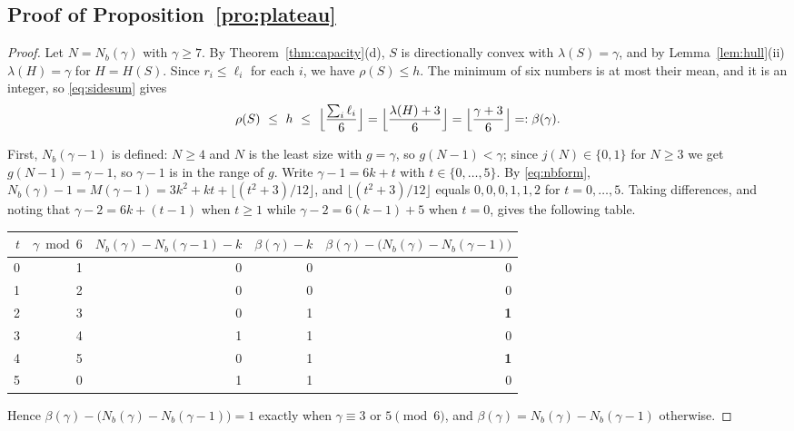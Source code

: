 \documentclass[11pt]{article}
\theoremstyle{plain}
\theoremstyle{definition}
\theoremstyle{remark}
\begin{document}
\subsection{Proof of Proposition~\ref{pro:plateau}}\label{sec:12.3}

\begin{proof}
Let \(N=N_{b}(\gamma)\) with \(\gamma\ge7\). By Theorem~\ref{thm:capacity}(d), \(S\) is
directionally convex with \(\lambda(S)=\gamma\), and by Lemma~\ref{lem:hull}(ii)
\(\lambda(H)=\gamma\) for \(H=H(S)\). Since \(r_{i}\le\ell_{i}\) for each \(i\), we have
\(\rho(S)\le h\). The minimum of six numbers is at most their mean, and it is an integer, so
\eqref{eq:sidesum} gives
\begin{equation}\label{eq:betadef}
   \rho(S)\ \le\ h\ \le\ \Bigl\lfloor\frac{\sum_{i}\ell_{i}}{6}\Bigr\rfloor
   =\Bigl\lfloor\frac{\lambda(H)+3}{6}\Bigr\rfloor
   =\Bigl\lfloor\frac{\gamma+3}{6}\Bigr\rfloor=:\beta(\gamma).
\end{equation}

First, \(N_{b}(\gamma-1)\) is defined: \(N\ge4\) and \(N\) is the least size with
\(g=\gamma\), so \(g(N-1)<\gamma\); since \(j(N)\in\{0,1\}\) for \(N\ge3\) we get
\(g(N-1)=\gamma-1\), so \(\gamma-1\) is in the range of \(g\). Write \(\gamma-1=6k+t\) with
\(t\in\{0,\dots,5\}\). By \eqref{eq:nbform},
\(N_{b}(\gamma)-1=M(\gamma-1)=3k^{2}+kt+\lfloor(t^{2}+3)/12\rfloor\), and
\(\lfloor(t^{2}+3)/12\rfloor\) equals \(0,0,0,1,1,2\) for \(t=0,\dots,5\). Taking
differences, and noting that \(\gamma-2=6k+(t-1)\) when \(t\ge1\) while
\(\gamma-2=6(k-1)+5\) when \(t=0\), gives the following table.

\begin{center}
\begin{tabular}{rrrrr}
\hline
\(t\) & \(\gamma\bmod 6\) & \(N_{b}(\gamma)-N_{b}(\gamma-1)-k\) & \(\beta(\gamma)-k\)
 & \(\beta(\gamma)-\bigl(N_{b}(\gamma)-N_{b}(\gamma-1)\bigr)\) \\
\hline
0 & 1 & 0 & 0 & 0 \\
1 & 2 & 0 & 0 & 0 \\
2 & 3 & 0 & 1 & \textbf{1} \\
3 & 4 & 1 & 1 & 0 \\
4 & 5 & 0 & 1 & \textbf{1} \\
5 & 0 & 1 & 1 & 0 \\
\hline
\end{tabular}
\end{center}

Hence \(\beta(\gamma)-\bigl(N_{b}(\gamma)-N_{b}(\gamma-1)\bigr)=1\) exactly when
\(\gamma\equiv3\) or \(5\pmod 6\), and \(\beta(\gamma)=N_{b}(\gamma)-N_{b}(\gamma-1)\)
otherwise.


\end{proof}
\end{document}
